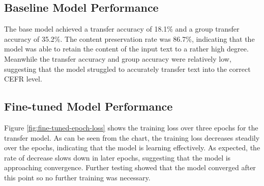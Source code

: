 \subsection*{Baseline Model Performance}
\label{ss:baseline_model_performance}
The base model achieved a transfer accuracy of 18.1\% and a group transfer accuracy of 35.2\%. The content preservation rate was 86.7\%, indicating that the model was able to retain the content of the input text to a rather high degree. Meanwhile the transfer accuracy and group accuracy were relatively low, suggesting that the model struggled to accurately transfer text into the correct CEFR level.
\subsection*{Fine-tuned Model Performance}
\label{ss:fine_tuned_model_performance}
Figure \ref{fig:fine-tuned-epoch-loss} shows the training loss over three epochs for the transfer model. As can be seen from the chart, the training loss decreases steadily over the epochs, indicating that the model is learning effectively. As expected, the rate of decrease slows down in later epochs, suggesting that the model is approaching convergence. Further testing showed that the model converged after this point so no further training was necessary.

